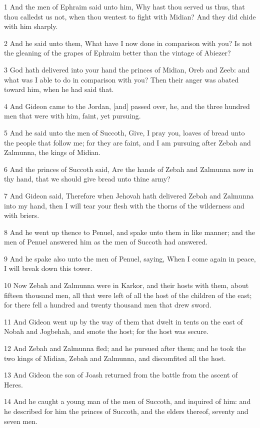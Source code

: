 \par 1 And the men of Ephraim said unto him, Why hast thou served us thus, that thou calledst us not, when thou wentest to fight with Midian? And they did chide with him sharply.
\par 2 And he said unto them, What have I now done in comparison with you? Is not the gleaning of the grapes of Ephraim better than the vintage of Abiezer?
\par 3 God hath delivered into your hand the princes of Midian, Oreb and Zeeb: and what was I able to do in comparison with you? Then their anger was abated toward him, when he had said that.
\par 4 And Gideon came to the Jordan, [and] passed over, he, and the three hundred men that were with him, faint, yet pursuing.
\par 5 And he said unto the men of Succoth, Give, I pray you, loaves of bread unto the people that follow me; for they are faint, and I am pursuing after Zebah and Zalmunna, the kings of Midian.
\par 6 And the princes of Succoth said, Are the hands of Zebah and Zalmunna now in thy hand, that we should give bread unto thine army?
\par 7 And Gideon said, Therefore when Jehovah hath delivered Zebah and Zalmunna into my hand, then I will tear your flesh with the thorns of the wilderness and with briers.
\par 8 And he went up thence to Penuel, and spake unto them in like manner; and the men of Penuel answered him as the men of Succoth had answered.
\par 9 And he spake also unto the men of Penuel, saying, When I come again in peace, I will break down this tower.
\par 10 Now Zebah and Zalmunna were in Karkor, and their hosts with them, about fifteen thousand men, all that were left of all the host of the children of the east; for there fell a hundred and twenty thousand men that drew sword.
\par 11 And Gideon went up by the way of them that dwelt in tents on the east of Nobah and Jogbehah, and smote the host; for the host was secure.
\par 12 And Zebah and Zalmunna fled; and he pursued after them; and he took the two kings of Midian, Zebah and Zalmunna, and discomfited all the host.
\par 13 And Gideon the son of Joash returned from the battle from the ascent of Heres.
\par 14 And he caught a young man of the men of Succoth, and inquired of him: and he described for him the princes of Succoth, and the elders thereof, seventy and seven men.
